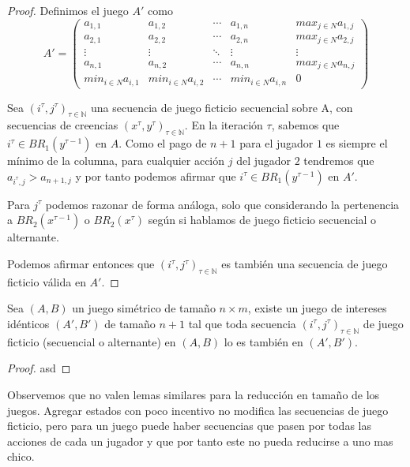 \begin{proof}
    Definimos el juego $A'$ como
    \begin{equation*}
        A' =
        \begin{pmatrix}
        a_{1,1} & a_{1,2} & \cdots & a_{1,n} & max_{j \in N} a_{1,j}    \\
        a_{2,1} & a_{2,2} & \cdots & a_{2,n} & max_{j \in N} a_{2,j}    \\
        \vdots  & \vdots  & \ddots & \vdots  & \vdots                   \\
        a_{n,1} & a_{n,2} & \cdots & a_{n,n} & max_{j \in N} a_{n,j}    \\
        min_{i \in N} a_{i,1} & min_{i \in N} a_{i,2} & \cdots & min_{i \in N} a_{i,n}        & 0
        \end{pmatrix}
    \end{equation*} 

    Sea $(i^\tau, j^\tau)_{\tau \in \mathbb{N}}$ una secuencia de juego ficticio secuencial sobre A, con secuencias de creencias $(x^\tau, y^\tau)_{\tau \in \mathbb{N}}$. En la iteración $\tau$, sabemos que $i^\tau \in BR_1(y^{\tau - 1})$ en $A$. Como el pago de $n+1$ para el jugador $1$ es siempre el mínimo de la columna, para cualquier acción $j$ del jugador $2$ tendremos que $a_{i^\tau, j} > a_{n+1,j}$ y por tanto podemos afirmar que $i^\tau \in BR_1(y^{\tau - 1})$ en $A'$.

    Para $j^\tau$ podemos razonar de forma análoga, solo que considerando la pertenencia a $BR_2(x^{\tau - 1})$ o $BR_2(x^\tau)$ según si hablamos de juego ficticio secuencial o alternante.

    Podemos afirmar entonces que $(i^\tau, j^\tau)_{\tau \in \mathbb{N}}$ es también una secuencia de juego ficticio  válida en $A'$.
\end{proof}

\begin{lemma}
    Sea $(A, B)$ un juego simétrico de tamaño $n \times m$, existe un juego de intereses idénticos $(A', B')$ de tamaño $n+1$ tal que toda secuencia $(i^\tau, j^\tau)_{\tau \in \mathbb{N}}$ de juego ficticio (secuencial o alternante) en $(A, B)$ lo es también en $(A', B')$.
\end{lemma}

\begin{proof}
    asd
\end{proof}


Observemos que no valen lemas similares para la reducción en tamaño de los juegos. Agregar estados con poco incentivo no modifica las secuencias de juego ficticio, pero para un juego puede haber secuencias que pasen por todas las acciones de cada un jugador y que por tanto este no pueda reducirse a uno mas chico.

